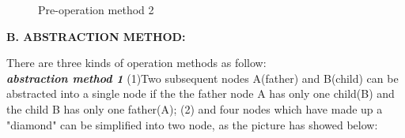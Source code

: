 \documentclass[12pt]{article}
\begin{document}
\begin{figure}
\begin{center}
\begin{minipage}[c]{0.5\textwidth}
\renewcommand{\figurename}{Figure}
\caption{Pre-operation method 2 }
\label{}
\end{minipage}
\end{center}
\end{figure}

\textbf{B. ABSTRACTION METHOD:}\



There are three kinds of operation methods as follow:\\

    \textit{\textbf{abstraction method 1}} (1)Two subsequent nodes A(father) and B(child) can be abstracted into a single node if the the father node A has only one child(B) and the child B has only one  father(A); (2)  and four nodes which have made up a "diamond" can be simplified into two node, as the picture has showed below:\
    
\end{document}
